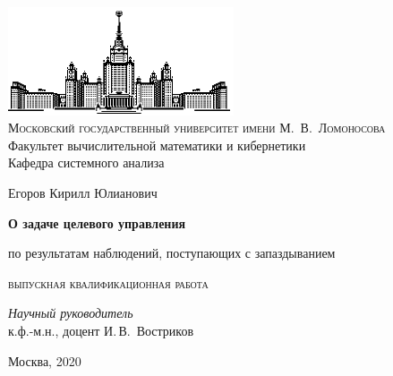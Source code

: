 \thispagestyle{empty}
\begin{center}
    \ \vspace{-3cm}

    \includegraphics[width=0.5\textwidth]{title_page/msu.eps}\\

    {\small{\scshape  Московский государственный университет имени М.~В.~Ломоносова}\\
    Факультет вычислительной математики и кибернетики\\
    Кафедра системного анализа}

    \vfill

    {\Large Егоров Кирилл Юлианович}

    \vspace{1cm}

    {\LARGE\bfseries О задаче целевого управления\par
    по результатам наблюдений,
    поступающих с запаздыванием}

    \vspace{1.5cm}

    {\scshape выпускная квалификационная работа}
\end{center}

\vspace{3cm}

\begin{flushright}
    \large
    \textit{Научный руководитель}\\
    к.ф.-м.н., доцент И.\,В.~Востриков
\end{flushright}

\vfill

\begin{center}
    Москва, 2020
\end{center}

\clearpage